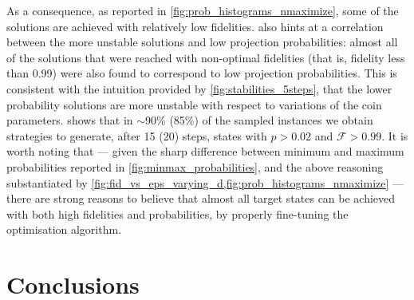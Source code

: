 As a consequence, as reported in \cref{fig:prob_histograms_nmaximize}, some of the solutions are achieved with relatively low fidelities.
 also hints at a correlation between the more unstable solutions and low projection probabilities:
almost all of the solutions that were reached with non-optimal fidelities (that is, fidelity less than 0.99) were also found to correspond to low projection probabilities.
This is consistent with the intuition provided by \cref{fig:stabilities_5steps},
that the lower probability solutions are more unstable with respect to variations of the coin parameters.
 shows that in $\sim$90\% (85\%) of the sampled instances we obtain strategies to generate, after 15 (20) steps, states with $p > 0.02$ and $\mathcal F > 0.99$.
It is worth noting that --- given the sharp difference between minimum and maximum probabilities reported in \cref{fig:minmax_probabilities}, and the above reasoning substantiated by \cref{fig:fid_vs_eps_varying_d,fig:prob_histograms_nmaximize} ---
there are strong reasons to believe that almost all target states can be achieved with both high fidelities and probabilities,
by properly fine-tuning the optimisation algorithm.


\section{Conclusions}
\label{sec:QWs:conclusions}

